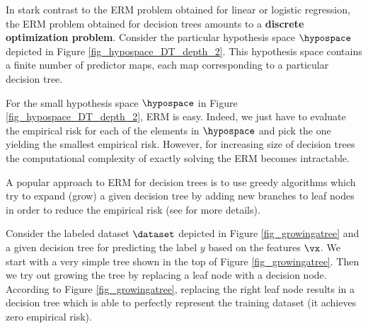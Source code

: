 \documentclass[12pt]{report}
\begin{document}
In stark contrast to the ERM problem obtained for linear or logistic 
regression, the ERM problem obtained for decision trees amounts 
to a {\bf discrete optimization problem}. Consider the particular 
hypothesis space $\hypospace$ depicted in Figure \ref{fig_hypospace_DT_depth_2}. 
This hypothesis space contains a finite number of predictor maps, 
each map corresponding to a particular decision tree. 

For the small hypothesis space $\hypospace$ in Figure \ref{fig_hypospace_DT_depth_2}, 
ERM is easy. Indeed, we just have to evaluate the empirical risk 
for each of the elements in $\hypospace$ and pick the one yielding 
the smallest empirical risk. However, for increasing size of decision 
trees the computational complexity of exactly solving the ERM becomes 
intractable. 

A popular approach to ERM for decision trees is to use greedy algorithms which try to expand (grow) 
a given decision tree by adding new branches to leaf nodes in order to reduce the empirical risk 
(see \cite[Chapter 8]{IntroSLR} for more details). 

\begin{center}
\end{center}

Consider the labeled dataset $\dataset$ depicted in Figure \ref{fig_growingatree} and a given decision tree for 
predicting the label $y$ based on the features $\vx$. We start with a very simple tree shown in the top of 
Figure \ref{fig_growingatree}. Then we try out growing the tree by replacing a leaf node with a decision node. 
According to Figure \ref{fig_growingatree}, replacing the right leaf node results in a decision tree which is 
able to perfectly represent the training dataset (it achieves zero empirical risk). 
 
 
\end{document}
